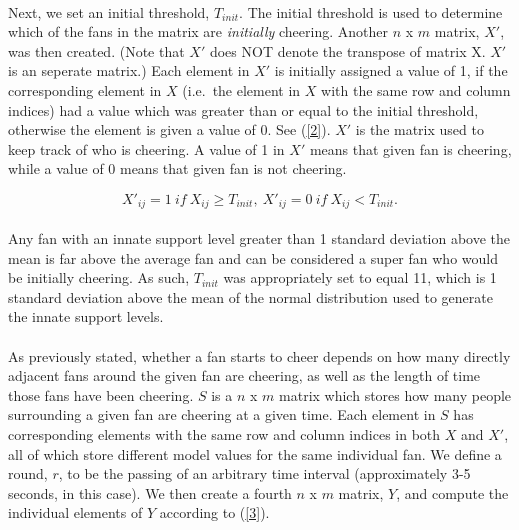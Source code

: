 \documentclass[oneside,12pt]{report}
\begin{document}
\paragraph{}
Next, we set an initial threshold, $T_{init}$. The initial threshold is used to determine which of the fans in the matrix are \textit{initially} cheering. Another $n$ x $m$ matrix, $X'$, was then created. (Note that $X'$ does NOT denote the transpose of matrix X. $X'$ is an seperate matrix.) Each element in $X'$ is initially assigned a value of 1, if the corresponding element in $X$ (i.e.~the element in $X$ with the same row and column indices) had a value which was greater than or equal to the initial threshold, otherwise the element is given a value of 0. See (\ref{2}). $X'$ is the matrix used to keep track of who is cheering. A value of 1 in $X'$ means that given fan is cheering, while a value of 0 means that given fan is not cheering. 

\begin{equation}
X'_{ij}=1~if~X_{ij}\geq T_{init},~X'_{ij}=0~if~X_{ij}<T_{init}.
\label{2}
\end{equation}

\paragraph{}
Any fan with an innate support level greater than 1 standard deviation above the mean is far above the average fan and can be considered a super fan who would be initially cheering. As such, $T_{init}$ was appropriately set to equal 11, which is 1 standard deviation above the mean of the normal distribution used to generate the innate support levels.

\paragraph{}
As previously stated, whether a fan starts to cheer depends on how many directly adjacent fans around the given fan are cheering, as well as the length of time those fans have been cheering. $S$ is a $n$ x $m$ matrix which stores how many people surrounding a given fan are cheering at a given time. Each element in $S$ has corresponding elements with the same row and column indices in both $X$ and $X'$, all of which store different model values for the same individual fan. We define a round, $r$, to be the passing of an arbitrary time interval (approximately 3-5 seconds, in this case). We then create a fourth $n$ x $m$ matrix, $Y$, and compute the individual elements of $Y$ according to (\ref{3}). 
\end{document}
